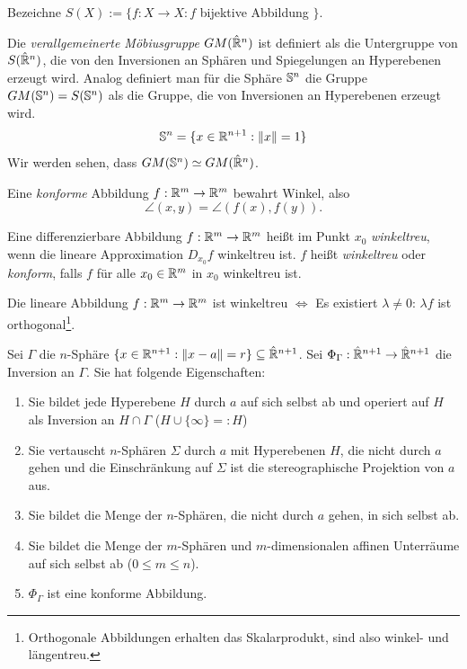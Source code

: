 Bezeichne $S(X) := \{ f : X \to X : f$ bijektive Abbildung $\}$.

\begin{defn*}
 Die \emph{verallgemeinerte Möbiusgruppe} $GM(\hat{\mathbb{R}}^n)$ ist definiert als die Untergruppe von $S(\hat{\mathbb{R}}^n)$, die von den Inversionen an Sphären und Spiegelungen an Hyperebenen erzeugt wird. Analog definiert man für die Sphäre $\mathbb{S}^n$ die Gruppe $GM(\mathbb{S}^n) = S(\mathbb{S}^n)$ als die Gruppe, die von Inversionen an Hyperebenen erzeugt wird. 
 \[ \mathbb{S}^n = \{ x \in \mathbb{R}^{n+1} : \| x \| = 1 \} \]
 Wir werden sehen, dass $GM(\mathbb{S}^n) \simeq GM( \hat{\mathbb{R}}^n )$.
\end{defn*}

\begin{defn*}
  Eine \emph{konforme} Abbildung $f: \mathbb{R}^m \to \mathbb{R}^m$ bewahrt Winkel, also
  \[ \angle(x,y) = \angle(f(x),f(y)). \]

  Eine differenzierbare Abbildung $f: \mathbb{R}^m \to \mathbb{R}^m$ heißt im Punkt $x_0$
  \emph{winkeltreu}, wenn die lineare Approximation $D_{x_0}f$ winkeltreu ist.
  $f$ heißt \emph{winkeltreu} oder \emph{konform}, falls $f$ für alle $x_0 \in
  \mathbb{R}^m$ in $x_0$ winkeltreu ist.

  Die lineare Abbildung $f: \mathbb{R}^m \to \mathbb{R}^m$ ist winkeltreu
  $\Leftrightarrow$ Es existiert $\lambda \ne 0$: $\lambda f$ ist
  orthogonal\footnote{Orthogonale Abbildungen erhalten das Skalarprodukt, sind
    also winkel- und längentreu.}.
\end{defn*}

\clearpage

\begin{thm}
 Sei $\Gamma$ die $n$-Sphäre $\{ x \in \mathbb{R}^{n+1} : \| x-a \| = r \} \subseteq \hat{\mathbb{R}}^{n+1}$. Sei $\Phi_\Gamma: \hat{\mathbb{R}}^{n+1} \to \hat{\mathbb{R}}^{n+1}$ die Inversion an $\Gamma$. Sie hat folgende Eigenschaften:
 \begin{enumerate}[1)]
  \item Sie bildet jede Hyperebene $H$ durch $a$ auf sich selbst ab und operiert auf $H$ als Inversion an $H \cap \Gamma$ ($H \cup \{ \infty \} =: H$)
  \item Sie vertauscht $n$-Sphären $\Sigma$ durch $a$ mit Hyperebenen $H$, die nicht durch $a$ gehen und die Einschränkung auf $\Sigma$ ist die stereographische Projektion von $a$ aus.
  \item Sie bildet die Menge der $n$-Sphären, die nicht durch $a$ gehen, in sich selbst ab.
  \item Sie bildet die Menge der $m$-Sphären und $m$-dimensionalen affinen Unterräume auf sich selbst ab ($0 \le m \le n$).
  \item $\Phi_\Gamma$ ist eine konforme Abbildung.
 \end{enumerate}
\end{thm}

